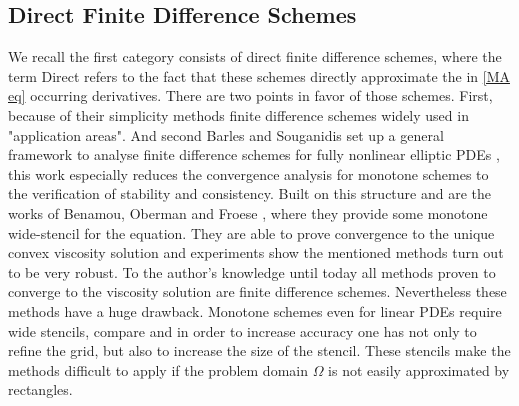 \subsection{Direct Finite Difference Schemes}

We recall the first category consists of direct finite difference schemes, where the term Direct refers to the fact that these schemes directly approximate the in \eqref{MA eq} occurring derivatives. 
There are two points in favor of those schemes. First, because of their simplicity methods finite difference schemes widely used in "application areas".  And second Barles and Souganidis set up a general framework to analyse finite difference schemes for fully nonlinear elliptic PDEs \cite{BS1991}, this work especially reduces the convergence analysis for monotone schemes to the verification of stability and consistency.
Built on this structure and are the works of Benamou, Oberman and Froese \cite{BFO2010, Oberman2008, FO2011}, where they provide some monotone wide-stencil for the \MA equation.
They are able to prove convergence to the unique convex viscosity solution and experiments show the mentioned methods turn out to be very robust. To the author's knowledge until today all methods proven to converge to the viscosity solution are finite difference schemes.
Nevertheless these methods have a huge drawback. Monotone schemes even for linear PDEs require wide stencils, compare \cite{MW1953}  and in order to increase accuracy one has not only to refine the grid, but also to increase the size of the stencil. These stencils make the methods difficult to apply if the problem domain $\Omega$ is not easily approximated by rectangles.

